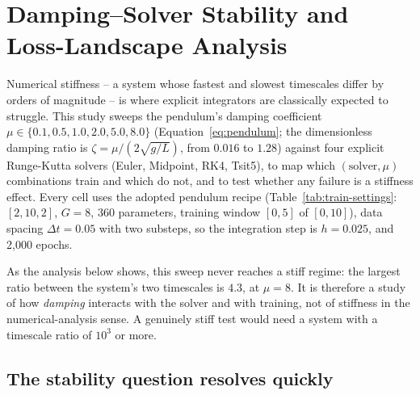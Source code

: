 \section{Damping--Solver Stability and Loss-Landscape Analysis}
\label{sec:track-d}

Numerical stiffness -- a system whose fastest and slowest timescales differ by
orders of magnitude -- is where explicit integrators are classically expected
to struggle. This study sweeps the pendulum's damping coefficient
$\mu\in\{0.1,0.5,1.0,2.0,5.0,8.0\}$ (Equation~\ref{eq:pendulum}; the
dimensionless damping ratio is $\zeta=\mu/(2\sqrt{g/L})$, from $0.016$ to
$1.28$) against four explicit Runge-Kutta solvers (Euler, Midpoint, RK4,
Tsit5), to map which $(\text{solver},\mu)$ combinations train and which do
not, and to test whether any failure is a stiffness effect. Every cell uses
the adopted pendulum recipe (Table~\ref{tab:train-settings}: $[2,10,2]$,
$G=8$, 360 parameters, training window $[0,5]$ of $[0,10]$), data spacing
$\Delta t=0.05$ with two substeps, so the integration step is $h=0.025$, and
2{,}000 epochs.

As the analysis below shows, this sweep never reaches a stiff regime: the
largest ratio between the system's two timescales is $4.3$, at $\mu=8$. It
is therefore a study of how \emph{damping} interacts with the solver and with
training, not of stiffness in the numerical-analysis sense. A genuinely stiff
test would need a system with a timescale ratio of $10^3$ or more.

\begin{expectbox}
\end{expectbox}

\subsection{The stability question resolves quickly}

